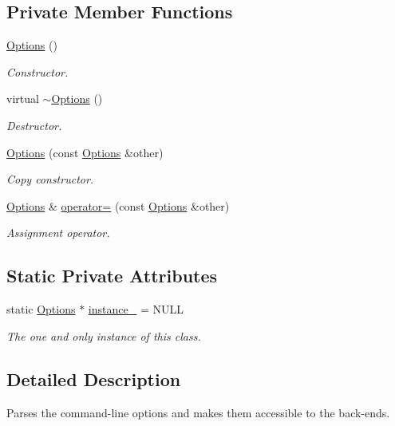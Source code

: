 \subsection*{Private Member Functions}
\begin{DoxyCompactItemize}
\item 
\hyperlink{classOptions_ab72fb640172a6109e34c8a5366563753}{Options} ()
\begin{DoxyCompactList}\small\item\em Constructor. \end{DoxyCompactList}\item 
virtual \hyperlink{classOptions_a86ddb85b183f8b58af5481f30a42fa92}{$\sim$\-Options} ()
\begin{DoxyCompactList}\small\item\em Destructor. \end{DoxyCompactList}\item 
\hyperlink{classOptions_a746ca91be29587927e0249be6e75817a}{Options} (const \hyperlink{classOptions}{Options} \&other)
\begin{DoxyCompactList}\small\item\em Copy constructor. \end{DoxyCompactList}\item 
\hyperlink{classOptions}{Options} \& \hyperlink{classOptions_aa668cd73b61005074c44ea99f0b9b831}{operator=} (const \hyperlink{classOptions}{Options} \&other)
\begin{DoxyCompactList}\small\item\em Assignment operator. \end{DoxyCompactList}\end{DoxyCompactItemize}
\subsection*{Static Private Attributes}
\begin{DoxyCompactItemize}
\item 
static \hyperlink{classOptions}{Options} $\ast$ \hyperlink{classOptions_a9097fb97d94616d9166bc7e8df97a58a}{instance\-\_\-} = N\-U\-L\-L
\begin{DoxyCompactList}\small\item\em The one and only instance of this class. \end{DoxyCompactList}\end{DoxyCompactItemize}


\subsection{Detailed Description}
Parses the command-\/line options and makes them accessible to the back-\/ends. 

